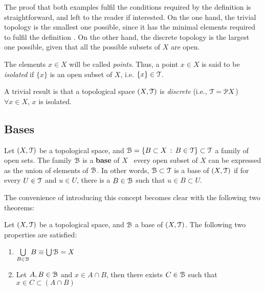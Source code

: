 The proof that both examples fulfil the conditions required by the definition
 is straightforward, and left to the reader if interested.
On the one hand, the trivial topology is the smallest one possible, since it has the
minimal elements required to fulfil the definition .
On the other hand, the discrete topology is the largest one possible, given that all
the possible subsets of $X$ are open.

\begin{definition}
	The elements $x\in X$ will be called \emph{points}.
	Thus, a point $x\in X$ is said to be \emph{isolated} if $\{x\}$ is an open subset
	of $X$, i.e. $\{x\}\in \EuScript{T}$.
\end{definition}

\begin{remark}
	A trivial result is that a topological space $(X,\EuScript{T})$ is \emph{discrete} (i.e.,
	$\EuScript{T}=\EuScript{P} X$) \iff\ $\forall x\in X$, $x$ is isolated.
\end{remark}

\subsection{Bases}\label{subsec:bases}

\begin{definition}
	Let $(X, \EuScript{T})$ be a topological space, and $\EuScript{B} = \{B \subset X\,:\, B \in \EuScript{T}\}\subset\EuScript{T}$
	a family of open sets.
	The family $\EuScript{B}$ is a \textbf{base} of $X$ \iff\, every open subset of $X$ can be
	expressed as the union of elements of $\EuScript{B}$. In other words, $\EuScript{B}\subset\EuScript{T}$ is a base
	of $(X,\EuScript{T})$ if for every $U\in\EuScript{T}$ and $u\in U$, there is a $B\in \EuScript{B}$ such that
	$u\in B\subset U$.
	\label{def:base}
\end{definition}

The convenience of introducing this concept becomes clear with the following two theorems:

\begin{theorem}
	Let $(X, \EuScript{T})$ be a topological space, and $\EuScript{B}$ a base of $(X, \EuScript{T})$.
	The following two properties are satisfied:
	\begin{enumerate}
		\item $\bigcup\limits_{B\in\EuScript{B}} B \equiv \bigcup\EuScript{B} = X$
		\item Let $A, B\in \EuScript{B}$ and $x\in A\cap B$, then there exists $C\in \EuScript{B}$ such
		that $x\in C\subset (A\cap B)$
	\end{enumerate}
\end{theorem}


